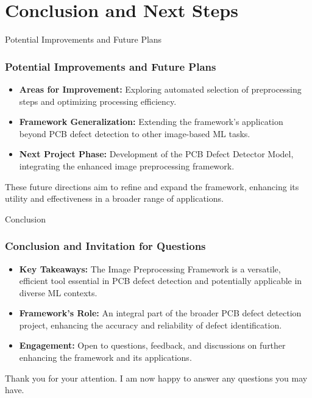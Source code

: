 \section{Conclusion and Next Steps}
\label{conclusion_section}


\begin{frame}{Potential Improvements and Future Plans}
    \frametitle{Potential Improvements and Future Plans}
    \begin{itemize}
        \item \textbf{Areas for Improvement:} Exploring automated selection of preprocessing steps and optimizing processing efficiency.
        \item \textbf{Framework Generalization:} Extending the framework's application beyond PCB defect detection to other image-based ML tasks.
        \item \textbf{Next Project Phase:} Development of the PCB Defect Detector Model, integrating the enhanced image preprocessing framework.
    \end{itemize}
    These future directions aim to refine and expand the framework, enhancing its utility and effectiveness in a broader range of applications.
\end{frame}

\begin{frame}{Conclusion}
    \frametitle{Conclusion and Invitation for Questions}
    \begin{itemize}
        \item \textbf{Key Takeaways:} The Image Preprocessing Framework is a versatile, efficient tool essential in PCB defect detection and potentially applicable in diverse ML contexts.
        \item \textbf{Framework's Role:} An integral part of the broader PCB defect detection project, enhancing the accuracy and reliability of defect identification.
        \item \textbf{Engagement:} Open to questions, feedback, and discussions on further enhancing the framework and its applications.
    \end{itemize}
    \vspace{1em}
    Thank you for your attention. I am now happy to answer any questions you may have.
\end{frame}
